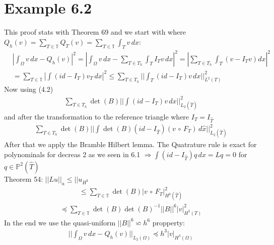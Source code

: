 \documentclass[11pt,a4paper]{article}
\begin{document}
\section{Example 6.2}
This proof stats with Theorem 69 and we start with where $Q_h(v) = \sum_{T \in \mathbb{T}}Q_T(v) =\sum_{T \in \mathbb{T}} \int_{T}v \, dx$:
\begin{align*}
&|\int_{\Omega} v \, dx -Q_h(v)|^2 = |\int_{\Omega}v\,dx-\sum_{T \in T_h}\int_TI_Tv\,dx|^2 = |\sum_{T \in T_h}\int_T(v-I_Tv)dx|^2 \\ & = \sum_{T \in \mathbb{T}}|\int(id-I_T)v_T\, dx |^2 \leq \sum_{T \in T_h}||\int_T(id-I_T)v\,dx||_{L^2(T)}^2
\end{align*}
Now using (4.2)
\begin{align*}
\sum_{T \in T_h}\det(B)||\int(id-I_T)v\,dx||^2_{L_2(\hat{T})}
\end{align*}
and after the transformation to the reference triangle where $I_T = I_{\hat{T}}$
\begin{align*}
\sum_{T \in T_h}\det(B)||\int \det(B)(id-I_{\hat{T}})(v\,\circ\,F_T)\,d\hat{x}||^2_{L_2(\hat{T})}
\end{align*}
After that we apply the Bramble Hilbert lemma. The Quatrature rule is exact for polynominals for decreas 2 as we seen in 6.1 $\Rightarrow \int(id-I_{\hat{T}})q\,dx = Lq = 0$ for $q \in \mathbb{P}^2(\hat{T})$\\Theorem 54: $||Lu||_a \leq $$ ||u_{H^k}$
\begin{align*}
 \leq \sum_{T \in \mathbb{T}} \det(B)|v\,\circ\,F_T|^2_{H^3(\hat{T})}
\end{align*}
\begin{align*}
\preceq \sum_{T \in \mathbb{T}}\det(B)\det(B)^{-1}||B||^6|v|^2_{H^3(T)}
\end{align*}
In the end we use the quasi-uniform $||B||^6 \backsimeq h^6$ propperty:
\begin{align*}
||\int_{\Omega}v\,dx-Q_h(v)||_{L_2(\Omega)}\preceq h^3|v|_{H^3(\Omega)}
\end{align*}
\end{document}
